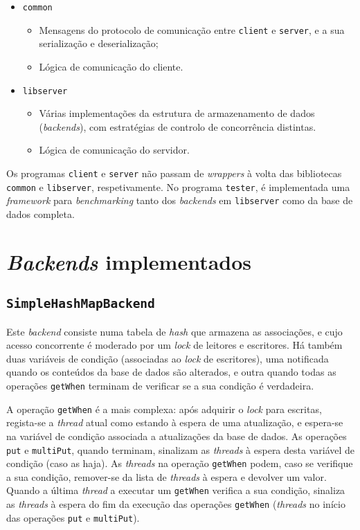 \documentclass[11pt, a4paper]{article}
\begin{document}
\begin{itemize}
    \item \texttt{common}
    \begin{itemize}
        \item Mensagens do protocolo de comunicação entre \texttt{client} e \texttt{server}, e a sua
            serialização e deserialização;

        \item Lógica de comunicação do cliente.
    \end{itemize}

    \item \texttt{libserver}
    \begin{itemize}
        \item Várias implementações da estrutura de armazenamento de dados (\emph{backends}), com
            estratégias de controlo de concorrência distintas.

        \item Lógica de comunicação do servidor.
    \end{itemize}
\end{itemize}

Os programas \texttt{client} e \texttt{server} não passam de \emph{wrappers} à volta das bibliotecas
\texttt{common} e \texttt{libserver}, respetivamente. No programa \texttt{tester}, é implementada
uma \emph{framework} para \emph{benchmarking} tanto dos \emph{backends} em \texttt{libserver} como
da base de dados completa.

\section{\emph{Backends} implementados}

\subsection{\texttt{SimpleHashMapBackend}}

Este \emph{backend} consiste numa tabela de \emph{hash} que armazena as associações, e cujo acesso
concorrente é moderado por um \emph{lock} de leitores e escritores. Há também duas variáveis de
condição (associadas ao \emph{lock} de escritores), uma notificada quando os conteúdos da base de
dados são alterados, e outra quando todas as operações \texttt{getWhen} terminam de verificar se a
sua condição é verdadeira.

A operação \texttt{getWhen} é a mais complexa: após adquirir o \emph{lock} para escritas, regista-se
a \emph{thread} atual como estando à espera de uma atualização, e espera-se na variável de condição
associada a atualizações da base de dados. As operações \texttt{put} e \texttt{multiPut}, quando
terminam, sinalizam as \emph{threads} à espera desta variável de condição (caso as haja). As
\emph{threads} na operação \texttt{getWhen} podem, caso se verifique a sua condição, remover-se da
lista de \emph{threads} à espera e devolver um valor. Quando a última \emph{thread} a executar um
\texttt{getWhen} verifica a sua condição, sinaliza as \emph{threads} à espera do fim da execução das
operações \texttt{getWhen} (\emph{threads} no início das operações \texttt{put} e \texttt{multiPut}).
\end{document}
